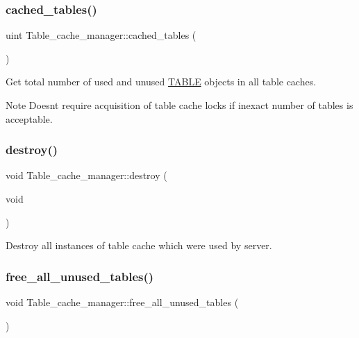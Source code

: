 \subsubsection{\texorpdfstring{cached\+\_\+tables()}{cached\_tables()}}
{\footnotesize\ttfamily uint Table\+\_\+cache\+\_\+manager\+::cached\+\_\+tables (\begin{DoxyParamCaption}{ }\end{DoxyParamCaption})}

Get total number of used and unused \mbox{\hyperlink{structTABLE}{T\+A\+B\+LE}} objects in all table caches.

\begin{DoxyNote}{Note}
Doesn\textquotesingle{}t require acquisition of table cache locks if inexact number of tables is acceptable. 
\end{DoxyNote}
\mbox{\label{classTable__cache__manager_af0e8904eae6270f9ec839d5dadba5460}} 
\subsubsection{\texorpdfstring{destroy()}{destroy()}}
{\footnotesize\ttfamily void Table\+\_\+cache\+\_\+manager\+::destroy (\begin{DoxyParamCaption}\item[{void}]{ }\end{DoxyParamCaption})}

Destroy all instances of table cache which were used by server. \mbox{\label{classTable__cache__manager_a8b9f94963366a5384895a9fff85c3f7e}} 
\subsubsection{\texorpdfstring{free\+\_\+all\+\_\+unused\+\_\+tables()}{free\_all\_unused\_tables()}}
{\footnotesize\ttfamily void Table\+\_\+cache\+\_\+manager\+::free\+\_\+all\+\_\+unused\+\_\+tables (\begin{DoxyParamCaption}{ }\end{DoxyParamCaption})}

